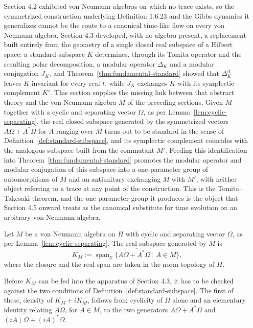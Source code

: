 Section 4.2 exhibited von Neumann algebras on which no trace exists, so the symmetrized construction underlying Definition 1.6.23 and the Gibbs dynamics it generalizes cannot be the route to a canonical time-like flow on every von Neumann algebra. Section 4.3 developed, with no algebra present, a replacement built entirely from the geometry of a single closed real subspace of a Hilbert space: a standard subspace $K$ determines, through its Tomita operator and the resulting polar decomposition, a modular operator $\Delta_K$ and a modular conjugation $J_K$, and Theorem~\ref{thm:fundamental-standard} showed that $\Delta_K^{it}$ leaves $K$ invariant for every real $t$, while $J_K$ exchanges $K$ with its symplectic complement $K'$. This section supplies the missing link between that abstract theory and the von Neumann algebra $M$ of the preceding sections. Given $M$ together with a cyclic and separating vector $\Omega$, as per Lemma~\ref{lem:cyclic-separating}, the real closed subspace generated by the symmetrized vectors $A\Omega + A^*\Omega$ for $A$ ranging over $M$ turns out to be standard in the sense of Definition~\ref{def:standard-subspace}, and its symplectic complement coincides with the analogous subspace built from the commutant $M'$. Feeding this identification into Theorem~\ref{thm:fundamental-standard} promotes the modular operator and modular conjugation of this subspace into a one-parameter group of automorphisms of $M$ and an antiunitary exchanging $M$ with $M'$, with neither object referring to a trace at any point of the construction. This is the Tomita--Takesaki theorem, and the one-parameter group it produces is the object that Section 4.5 onward treats as the canonical substitute for time evolution on an arbitrary von Neumann algebra.

\begin{definition}\label{def:KM-subspace}
	Let $M$ be a von Neumann algebra on $H$ with cyclic and separating vector $\Omega$, as per Lemma~\ref{lem:cyclic-separating}. The real subspace generated by $M$ is
	\[
	K_M := \overline{\operatorname{span}_{\mathbb{R}} \{A\Omega + A^*\Omega \mid A \in M\}},
	\]
	where the closure and the real span are taken in the norm topology of $H$.
\end{definition}

Before $K_M$ can be fed into the apparatus of Section 4.3, it has to be checked against the two conditions of Definition~\ref{def:standard-subspace}. The first of these, density of $K_M + iK_M$, follows from cyclicity of $\Omega$ alone and an elementary identity relating $A\Omega$, for $A \in M$, to the two generators $A\Omega + A^*\Omega$ and $(iA)\Omega + (iA)^*\Omega$.

